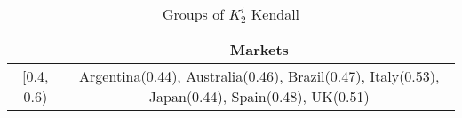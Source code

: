 
\begin{table}[ph]
\centering
\small
\begin{tabular}{ |c|c| }
\hline
& Markets \\
\hline
    [0.4, 0.6) & Argentina(0.44), Australia(0.46), Brazil(0.47), Italy(0.53), Japan(0.44), Spain(0.48), UK(0.51) \\ 
 \hline 
\end{tabular}
\caption{Groups of $K_2^i$ Kendall}
\end{table}

